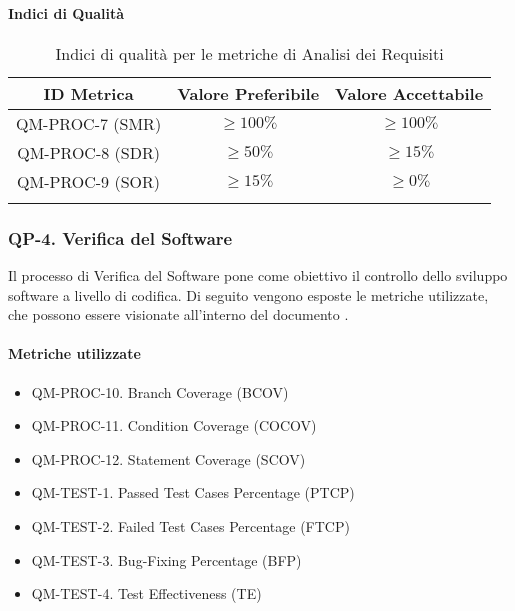 		\paragraph{Indici di Qualità}

			\begin{center}
				\begin{longtable}{|c|c|c|}
				\hline
				\rowcolor{lighter-grayer}
				\textbf{ID Metrica} & \textbf{Valore Preferibile} & \textbf{Valore Accettabile}\\
				\hline
				\endfirsthead
				\hline
				QM-PROC-7 (SMR) & \(\geq 100\%\) & \(\geq 100\%\) \\
				\hline
				QM-PROC-8 (SDR) & \(\geq 50\%\) & \(\geq 15\%\) \\
				\hline
				QM-PROC-9 (SOR) & \(\geq 15\%\) & \(\geq 0\%\) \\
				\hline
				\caption{Indici di qualità per le metriche di Analisi dei Requisiti}
				\end{longtable}
			\end{center}

	\subsubsection{QP-4. Verifica del Software}

		Il processo di Verifica del Software pone come obiettivo il controllo dello sviluppo software a livello di codifica.
		Di seguito vengono esposte le metriche utilizzate, che possono essere visionate all'interno del documento .

		\paragraph{Metriche utilizzate}

			\begin{itemize}
				\item QM-PROC-10. Branch Coverage (BCOV)
				\item QM-PROC-11. Condition Coverage (COCOV)
				\item QM-PROC-12. Statement Coverage (SCOV)
				\item QM-TEST-1. Passed Test Cases Percentage (PTCP)
				\item QM-TEST-2. Failed Test Cases Percentage (FTCP)
				\item QM-TEST-3. Bug-Fixing Percentage (BFP)
				\item QM-TEST-4. Test Effectiveness (TE)
			\end{itemize}


